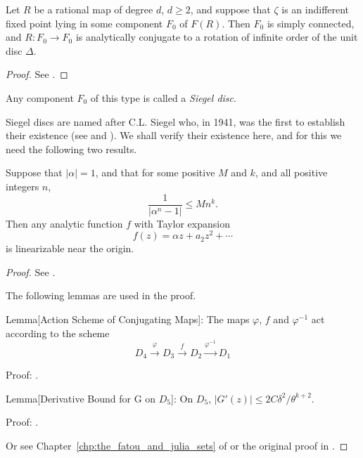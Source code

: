 \begin{theorem}
    \label{thm:Fatou_components_containing_indifferent_fixed_points_are_Siegel_discs}
    Let $R$ be a rational map of degree $d$, $d \geq 2$, and suppose that
    $\zeta$ is an indifferent fixed point lying in some component $F_0$ of
    $F(R)$. Then $F_0$ is simply connected, and $R: F_0 \to F_0$ is analytically
    conjugate to a rotation of infinite order of the unit disc $\Delta$.
\end{theorem}
\begin{proof}
    See \cite[134--136]{Beardon1991}.
\end{proof}

\begin{definition}
    Any component $F_0$ of this type is called a \emph{Siegel disc}.
\end{definition}

Siegel discs are named after C.L. Siegel who, in 1941, was the first to
establish their existence (see \cite{Siegel1942} and \cite{Siegel1971}). We
shall verify their existence here, and for this we need the following two
results.

\begin{theorem}
    \label{thm:condition_for_an_analytic_function_to_be_linearizable}
    Suppose that $|\alpha| = 1$, and that for some positive $M$ and $k$, and all
    positive integers $n$,
    \begin{equation}
        \label{eq:condition_for_an_analytic_function_to_be_linearizable}
        \frac{1}{|\alpha^n - 1|} \leq M n^k.
    \end{equation}
    Then any analytic function $f$ with Taylor expansion
    \begin{equation*}
        f(z) = \alpha z + a_2 z^2 + \cdots
    \end{equation*}
    is linearizable near the origin.
\end{theorem}
\begin{proof}
    See \cite[136--141]{Beardon1991}.

    The following lemmas are used in the proof.

    Lemma[Action Scheme of Conjugating Maps]: The maps $\varphi$, $f$ and
    $\varphi^{-1}$ act according to the scheme
    \begin{equation*}
        D_4 \xrightarrow{\varphi} D_3 \xrightarrow{f} D_2 \xrightarrow{\varphi^{-1}} D_1
    \end{equation*}

    Proof: \cite[139]{Beardon1991}.

    Lemma[Derivative Bound for G on $D_5$]: On $D_5$, $|G'(z)| \leq 2C\delta^2 / \theta^{k+2}$.

    Proof: \cite[139]{Beardon1991}.

    Or see Chapter~\ref{chp:the_fatou_and_julia_sets} of \cite{Siegel1971} or
    the original proof in \cite{Siegel1942}.
\end{proof}

